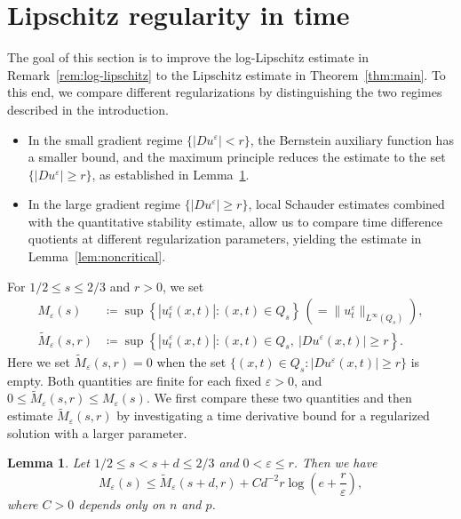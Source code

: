 \documentclass[a4paper,11pt]{amsart}
\theoremstyle{plain}
\newtheorem{lemma}[theorem]{Lemma}
\theoremstyle{definition}
\numberwithin{equation}{section}
\begin{document}
\section{Lipschitz regularity in time}\label{sec:time-estimates}
The goal of this section is to improve the log-Lipschitz estimate in Remark~\ref{rem:log-lipschitz} to the Lipschitz estimate in Theorem~\ref{thm:main}. To this end, we compare different regularizations by distinguishing the two regimes described in the introduction. 
\begin{itemize}
    \item In the small gradient regime $\{|Du^\varepsilon|<r\}$, the Bernstein auxiliary function has a smaller bound, and the maximum principle reduces the estimate to the set $\{|Du^\varepsilon|\geq r\}$, as established in Lemma~\ref{lem:small-gradient}. 
    \item In the large gradient regime $\{|Du^\varepsilon| \geq r\}$, local Schauder estimates combined with the quantitative stability estimate, allow us to compare time difference quotients at different regularization parameters, yielding the estimate in Lemma~\ref{lem:noncritical}.
\end{itemize}


For $1/2\leq s\leq2/3$ and $r>0$, we set
\begin{equation*}
\begin{aligned}
    M_\varepsilon(s)&\coloneqq\sup\left\{|u_t^\varepsilon(x,t)|:(x,t)\in Q_s\right\} \,(=\|u_t^\varepsilon\|_{L^\infty(Q_s)}),\\
    \widetilde M_\varepsilon(s,r)&\coloneqq \sup\left\{|u_t^\varepsilon(x,t)|: (x,t)\in Q_s,\ |Du^\varepsilon(x,t)|\geq r\right\}.
 \end{aligned}
\end{equation*}
Here we set $\widetilde M_\varepsilon(s,r)=0$ when the set $\{(x,t)\in Q_s:|Du^\varepsilon(x,t)|\geq r\}$ is empty. Both quantities are finite for each fixed $\varepsilon>0$, and $0\leq\widetilde M_\varepsilon(s,r)\leq M_\varepsilon(s)$. We first compare these two quantities and then estimate $\widetilde M_\varepsilon(s,r)$ by investigating a time derivative bound for a regularized solution with a larger parameter. 

\begin{lemma}\label{lem:small-gradient}
Let $1/2\leq s<s+d\leq2/3$ and $0< \varepsilon\leq r$. Then we have
\begin{equation}\label{eq:small-gradient}
    M_\varepsilon(s)\leq\widetilde M_\varepsilon(s+d,r)+Cd^{-2}r\log\left(e+\frac r\varepsilon\right),
\end{equation}
where $C>0$ depends only on $n$ and $p$.
\end{lemma}
\end{document}

